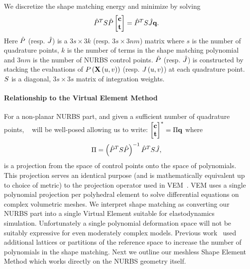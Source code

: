 We discretize the shape matching energy and minimize by solving
\begin{equation}
\hat{P}^TS\hat{P}\begin{bmatrix} \mathbf{c}\\ \mathbf{t} \end{bmatrix} = \hat{P}^TS\hat{J}\mathbf{q}.
\label{eq:shapematch}
\end{equation} Here $\hat{P}$ (resp. $\hat{J}$) is a $3s \times 3k$ (resp. $3s \times 3nm$) matrix where $s$ is the number of quadrature points, 
$k$ is the number of  terms in the shape matching polynomial and $3nm$ is the number of NURBS control points. 
$\hat{P}$ (resp. $\hat{J}$) is constructed by stacking the evaluations of $P\left(\mathbf{X}\left(u,v\right)\right)$ (resp. $J\left(u, v\right)$) at each
quadrature point.
$S$ is a diagonal, $3s \times 3s$ matrix of integration weights.

\paragraph*{Relationship to the Virtual Element Method}
For a non-planar NURBS part, and given a sufficient number of quadrature points, ~ will be well-posed allowing us to write: $\begin{bmatrix} \mathbf{c}\\ \mathbf{t} \end{bmatrix}^* = \Pi\mathbf{q}$ where
\begin{equation*}
    \Pi = \left(\hat{P}^TS\hat{P}\right)^{-1}\hat{P}^TS\hat{J},
\end{equation*} is a projection from the space of control points onto the space of polynomials. 
This projection serves an identical purpose (and is mathematically equivalent up to choice of metric) to the projection operator used in VEM~\cite{10.1142/S021820251440003X}.
VEM uses a single polynomial projection per polyhedral element to solve differential equations on complex volumetric meshes.
We interpret shape matching as converting our NURBS part into a single Virtual Element suitable for elastodynamics simulation.
Unfortunately a single polynomial deformation space will not be suitably expressive for even moderately complex models. 
Previous work~\cite{10.1145/1073204.1073216,10.1145/1275808.1276480} used additional lattices or partitions of the reference space to 
increase the number of polynomials in the shape matching. Next we outline our meshless Shape Element Method which works directly on the NURBS
geometry itself.


